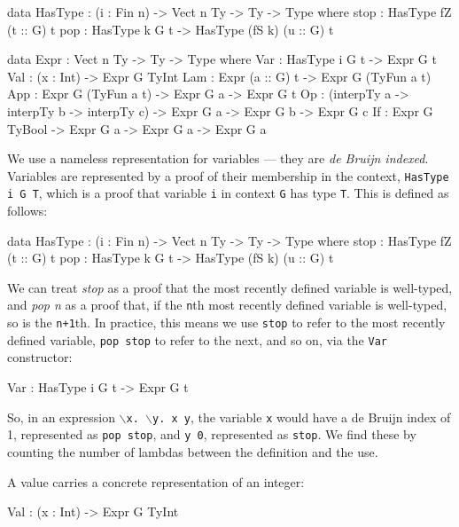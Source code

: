 \begin{code}[caption={Expression representation},label=exprty, float=htp]
data HasType : (i : Fin n) -> Vect n Ty -> Ty -> Type where
    stop : HasType fZ (t :: G) t
    pop  : HasType k G t -> HasType (fS k) (u :: G) t

data Expr : Vect n Ty -> Ty -> Type where
    Var : HasType i G t -> Expr G t
    Val : (x : Int) -> Expr G TyInt
    Lam : Expr (a :: G) t -> Expr G (TyFun a t)
    App : Expr G (TyFun a t) -> Expr G a -> Expr G t
    Op  : (interpTy a -> interpTy b -> interpTy c) -> Expr G a ->
          Expr G b -> Expr G c
    If  : Expr G TyBool -> Expr G a -> Expr G a -> Expr G a
\end{code}

\noindent
We use a nameless representation for variables --- they are \emph{de Bruijn indexed}.
Variables are represented by a proof of their membership in the context, \texttt{HasType i G T}, which is a proof that variable \texttt{i} in context  \texttt{G} has type \texttt{T}. This is defined as follows:

\begin{code}
data HasType : (i : Fin n) -> Vect n Ty -> Ty -> Type where
    stop : HasType fZ (t :: G) t
    pop  : HasType k G t -> HasType (fS k) (u :: G) t
\end{code}

\noindent
We can treat \emph{stop} as a proof that the most recently defined variable is well-typed, and \emph{pop n} as a proof that, if the \texttt{n}th most recently defined variable is well-typed, so is the \texttt{n+1}th.
In practice, this means we use \texttt{stop} to refer to the most recently defined variable, \texttt{pop stop} to refer to the next, and so on, via the \texttt{Var} constructor:

\begin{code}
Var : HasType i G t -> Expr G t
\end{code}

\noindent
So, in an expression \texttt{$\backslash$x. $\backslash$y. x y},  the variable \texttt{x} would have a de Bruijn index of 1, represented as \texttt{pop stop}, and \texttt{y 0}, represented as \texttt{stop}.
We find these by counting the number of lambdas between the definition and the use.

\noindent
A value carries a concrete representation of an integer: 

\begin{code}
Val : (x : Int) -> Expr G TyInt
\end{code}

